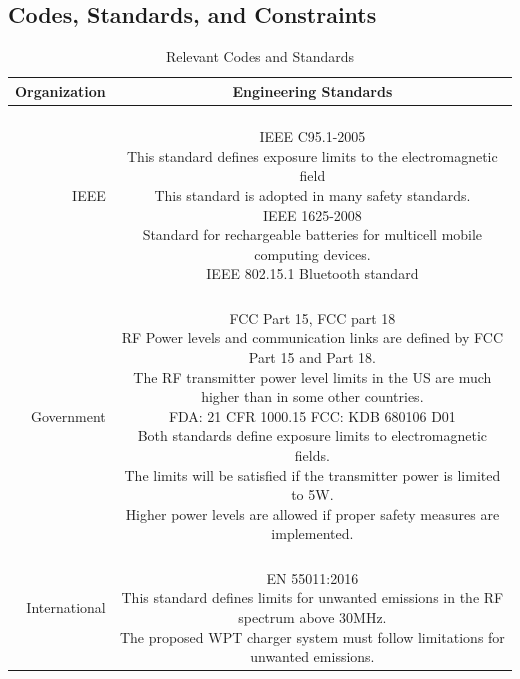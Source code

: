 \documentclass[12pt]{article}
\begin{document}
\begin{appendices}

\section{Codes, Standards, and Constraints}
\begin{table}[h!]
\centering
\caption{Relevant Codes and Standards}
\begin{tabular} {| r | c | }
\hline
\parbox{0.17\linewidth}{\centering Organization} &   \parbox{0.772\linewidth}{\centering Engineering Standards}\\
\hline
\parbox{0.17\linewidth}{\raggedleft IEEE} &   \parbox{0.772\linewidth}{\hfill \\
IEEE C95.1-2005\\
This standard defines exposure limits to the electromagnetic field \\
This standard is adopted in many safety standards. \\
IEEE 1625-2008 \\
Standard for rechargeable batteries for multicell mobile computing devices.\\
IEEE 802.15.1 Bluetooth standard \\
}\\
\hline
\parbox{0.17\linewidth}{\raggedleft Government} &   \parbox{0.772\linewidth}{\hfill \\
FCC Part 15, FCC part 18\\
RF Power levels and communication links are defined by FCC Part 15 and Part 18.\\
The RF transmitter power level limits in the US are much higher than in some other countries.\\
FDA: 21 CFR 1000.15 FCC: KDB 680106 D01   \\
Both standards define exposure limits to electromagnetic fields.\\
The limits will be satisfied if the transmitter power is limited to 5W.\\
Higher power levels are allowed if proper safety measures are implemented.\\
}\\
\hline
\parbox{0.17\linewidth}{\raggedleft International} &   \parbox{0.772\linewidth}{\hfill \\
EN 55011:2016\\
This standard defines limits for unwanted emissions in the RF spectrum above 30MHz. \\
The proposed WPT charger system must follow limitations for unwanted emissions.\\
}\\
\hline
\end{tabular}
\end{table}
\hfill
\pagebreak


\end{appendices}
\end{document}
